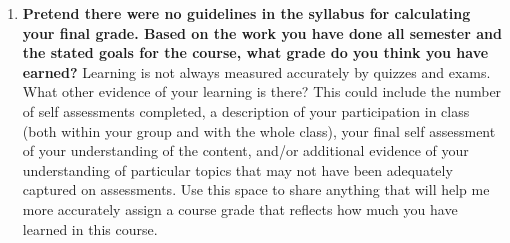 \documentclass{article}
\begin{document}
\begin{enumerate}
\item \textbf{Pretend there were no guidelines in the syllabus for calculating your final grade. Based on the work you have done all semester and the stated goals for the course, what grade do you think you have earned?} Learning is not always measured accurately by quizzes and exams. What other evidence of your learning is there? This could include the number of self assessments completed, a description of your participation in class (both within your group and with the whole class), your final self assessment of your understanding of the content, and/or additional evidence of your understanding of particular topics that may not have been adequately captured on assessments. Use this space to share anything that will help me more accurately assign a course grade that reflects how much you have learned in this course.
\end{enumerate}
\end{document}
